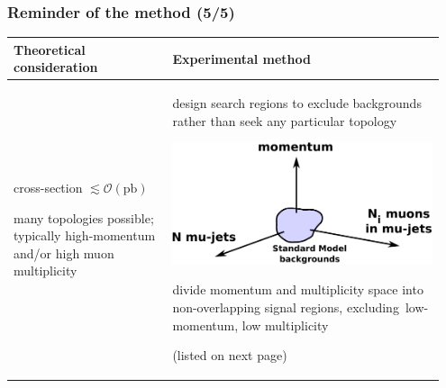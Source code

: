 \documentclass[compress]{beamer}
\begin{document}
\begin{frame}
\frametitle{Reminder of the method (5/5)}

\renewcommand{\arraystretch}{1.7}
\begin{tabular}{p{0.35\linewidth} | p{0.6\linewidth}}
Theoretical consideration & Experimental method \\\hline

cross-section $\lesssim \mathcal{O}(\mbox{pb})$

\vspace{0.25 cm}
many topologies possible; typically high-momentum and/or high muon multiplicity & design search regions to exclude backgrounds rather than seek any particular topology

\begin{center}
\includegraphics[width=0.8\linewidth]{signal_regions.pdf}
\end{center}

divide momentum and multiplicity space into non-overlapping signal regions, \mbox{excluding low-momentum,} low multiplicity

\vspace{0.25 cm}
(listed on next page)
\end{tabular}
\end{frame}
\end{document}
